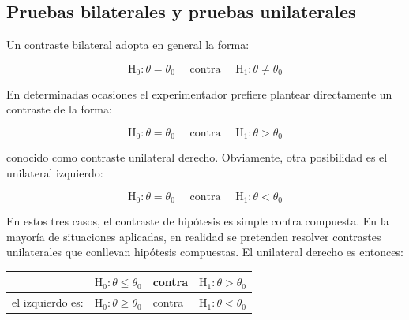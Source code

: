 \documentclass[
]{article}
\begin{document}
\subsection{Pruebas bilaterales y pruebas unilaterales}\label{pruebas-bilaterales-y-pruebas-unilaterales}

Un contraste bilateral adopta en general la forma:

\[
\mathrm{H}_{0}: \theta=\theta_{0} \quad \text { contra } \quad \mathrm{H}_{1}: \theta \neq \theta_{0}
\]

En determinadas ocasiones el experimentador prefiere plantear directamente un contraste de la forma:

\[
\mathrm{H}_{0}: \theta=\theta_{0} \quad \text { contra } \quad \mathrm{H}_{1}: \theta>\theta_{0}
\]

conocido como contraste unilateral derecho. Obviamente, otra posibilidad es el unilateral izquierdo:

\[
\mathrm{H}_{0}: \theta=\theta_{0} \quad \text { contra } \quad \mathrm{H}_{1}: \theta<\theta_{0}
\]

En estos tres casos, el contraste de hipótesis es simple contra compuesta. En la mayoría de situaciones aplicadas, en realidad se pretenden resolver contrastes unilaterales que conllevan hipótesis compuestas. El unilateral derecho es entonces:

\begin{longtable}[]{@{}
  >{\raggedright\arraybackslash}p{}
  >{\raggedright\arraybackslash}p{}
  >{\raggedright\arraybackslash}p{}
  >{\raggedright\arraybackslash}p{}@{}}
\toprule\noalign{}
\begin{minipage}[b]{\linewidth}\raggedright
\end{minipage} & \begin{minipage}[b]{\linewidth}\raggedright
\(\mathrm{H}_{0}: \theta \leq \theta_{0}\)
\end{minipage} & \begin{minipage}[b]{\linewidth}\raggedright
contra
\end{minipage} & \begin{minipage}[b]{\linewidth}\raggedright
\(\mathrm{H}_{1}: \theta>\theta_{0}\)
\end{minipage} \\
\midrule\noalign{}
\endhead
\bottomrule\noalign{}
\endlastfoot
el izquierdo es: & \(\mathrm{H}_{0}: \theta \geq \theta_{0}\) & contra & \(\mathrm{H}_{1}: \theta<\theta_{0}\) \\
\end{longtable}
\end{document}

